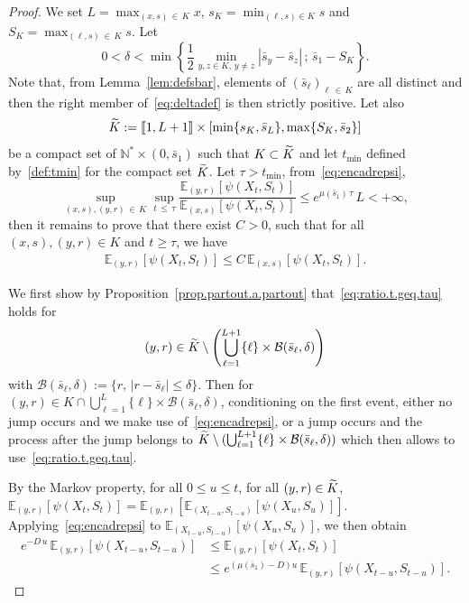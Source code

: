 \documentclass[10pt]{amsart}
\theoremstyle{definition}\newtheorem{defi}[theo]{Definition}\newtheorem{rema}[theo]{Remark}\newtheorem{exam}[theo]{Example}\newtheorem{exem}[theo]{Example}\newtheorem{nota}[theo]{Notation}
\newcommand{\llbracket}{\mathopen{[\mkern -2.7mu[}}
\newcommand{\rrbracket}{\mathclose{]\mkern -2.7mu]}}
\newcommand{\NN}{\mathbb{N}}
\newcommand{\EE}{\mathbb{E}}
\newcommand{\clB}{\mathcal{B}}
\newcommand{\SminK}{s_K}
\newcommand{\SmaxK}{S_K}
\newcommand{\barmu}{\mu(\bar s_1)}
\newcommand{\1}{\mathbf{1}}
\let\oldtilde\tilde
\renewcommand*{\tilde}[1]{\mathchoice{\widetilde{#1}}{\widetilde{#1}}{\oldtilde{#1}}{\oldtilde{#1}}}
\begin{document}
\begin{proof}
We set $L=\max_{(x,s)\,\in\,K}x$, $\SminK=\min_{(\ell, s)\in K} s $ and $\SmaxK=\max_{(\ell, s)\,\in\,K} s $. Let
\begin{equation}\label{eq:deltadef}
0<\delta < \min\left\{\frac{1}{2} \min_{y,z \in K, \, y\neq z } |\bar s_y - \bar s_z|\, ; \, \bar s_1-\SmaxK\right\}.
\end{equation}
Note that, from Lemma~\ref{lem:defsbar}, elements of $(\bar s_\ell)_{\ell \,\in\,K}$ are all distinct and then the right member of~\eqref{eq:deltadef} is then strictly positive. Let also 
\[
\tilde K := \llbracket 1, L+1 \rrbracket \times [\min\{s_K, \bar s_L\}, \max\{S_K, \bar s_2\}]
\]
be a compact set of $\NN^*\times (0,\bar s_1)$ such that $K\subset \tilde K$ and let $t_{\min}$ defined by~\eqref{def:tmin} for the compact set $\tilde K$. Let $\tau>t_{\min}$, from~\eqref{eq:encadrepsi},
\[
\sup_{(x,s),(y,r)\,\in\,K} \sup_{t\,\leq\,\tau} \frac{\EE_{(y,r)} \left[\psi (X_{t}, S_{t})\right]}{\EE_{(x,s)} \left[\psi (X_{t}, S_{t})\right]}
\leq e^{\mu(\bar s_1)\,\tau}\,L<+ \infty,
\]
then it remains to prove that there exist $C>0$, such that for all $(x,s),(y,r) \in K$ and $t\geq \tau$, we have
\begin{align}\label{eq:ratio.t.geq.tau}
\EE_{(y,r)} \left[\psi (X_{t}, S_{t})\right]\leq C\,\EE_{(x,s)} \left[\psi (X_{t}, S_{t})\right].
\end{align}

We first show by Proposition~\ref{prop.partout.a.partout} that~\eqref{eq:ratio.t.geq.tau} holds for
\[
(y,r)\in \tilde K \setminus \left(\bigcup_{\ell= 1}^{L+1} \{\ell\} \times \clB(\bar s_\ell, \delta)\right)
\]
with $\clB(\bar s_\ell, \delta):=\{r,\, |r-\bar s_\ell|\leq\delta\}$. Then for $(y,r) \in K \cap \bigcup_{\ell= 1}^L \{\ell\} \times \clB(\bar s_\ell, \delta)$, conditioning on the first event, either no jump occurs and we make use of~\eqref{eq:encadrepsi}, or a jump occurs and the process after the jump belongs to $\tilde K \setminus(\bigcup_{\ell= 1}^{L+1} \{\ell\} \times \clB(\bar s_\ell, \delta))$ which then allows to use~\eqref{eq:ratio.t.geq.tau}.


By the Markov property, for all $0\leq u\leq t$, for all $(y,r)\in \tilde K$, $\EE_{(y,r)}[\psi(X_t,S_t)] = \EE_{(y,r)}[\EE_{(X_{t-u},S_{t-u})}[\psi(X_u,S_u)]] $. Applying~\eqref{eq:encadrepsi} to $\EE_{(X_{t-u},S_{t-u})}[\psi(X_u,S_u)]$, we then obtain
\begin{equation}\label{eq:esppsi}
\begin{split}
e^{-D\,u}\,\EE_{(y,r)}\left[\psi(X_{t-u},S_{t-u})\right]
&\leq \EE_{(y,r)}\left[\psi(X_t,S_t)\right]
\\
&\leq e^{(\barmu-D)u}\,\EE_{(y,r)}\left[\psi(X_{t-u},S_{t-u})\right].
\end{split}
\end{equation}


\end{proof}
\end{document}
